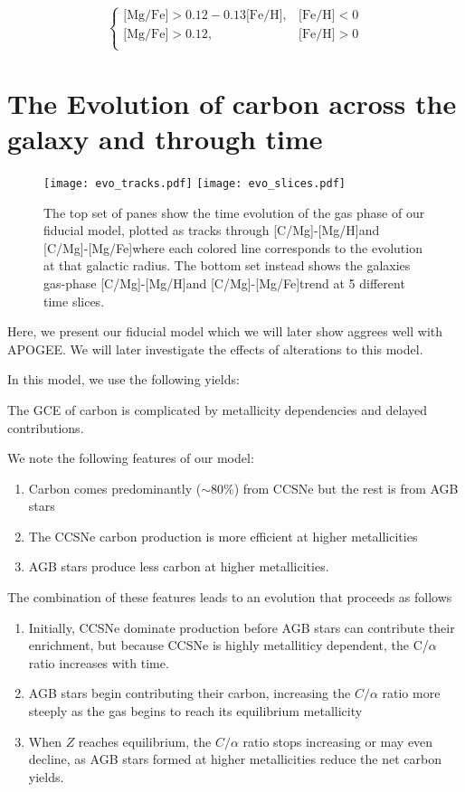 \documentclass[12pt,oneside]{report}
\newcommand{\caah}{[C/Mg]-[Mg/H]}
\newcommand{\caafe}{[C/Mg]-[Mg/Fe]}
\begin{document}
\begin{equation}
\begin{cases}
\text{[Mg/Fe]} >0.12-0.13\text{[Fe/H]}, & \text{[Fe/H]}<0\\
\text{[Mg/Fe]} >0.12, & \text{[Fe/H]}>0\\
\end{cases}
\end{equation}




\section{The Evolution of carbon across the galaxy and through time}

\begin{figure}
\label{fig:c_evo}
\texttt{[image: evo\_tracks.pdf]}
\texttt{[image: evo\_slices.pdf]}
\caption[Carbon chemical evolution tracks]{The top set of panes show the time evolution of the gas phase of our
    fiducial model, plotted as tracks through \caah and \caafe where each colored line corresponds to the evolution at that galactic radius. 
The bottom set instead shows the galaxies gas-phase \caah and \caafe trend at 5 different time slices. 
}
\end{figure}

Here, we present our fiducial model which we will later show aggrees well with APOGEE. We will later investigate the effects of alterations to this model. 

In this model, we use the following yields:

The GCE of carbon is complicated by metallicity dependencies and delayed contributions. 

We note the following features of our model:

\begin{enumerate}
    \item Carbon comes predominantly ($\sim80\%$) from CCSNe but the rest is from AGB stars
    \item The CCSNe carbon production is more efficient at higher metallicities
    \item AGB stars produce less carbon at higher metallicities.
\end{enumerate}


The combination of these features leads to an evolution that proceeds as follows
\begin{enumerate}
    \item Initially, CCSNe dominate production before AGB stars can contribute their enrichment, but because CCSNe is highly metalliticy dependent, the C/$\alpha$ ratio increases with time.
    \item AGB stars begin contributing their carbon, increasing the $C/\alpha$ ratio more steeply as the gas begins to reach its equilibrium metallicity
    \item When $Z$ reaches equilibrium, the $C/\alpha$ ratio stops increasing or may even decline, as AGB stars formed at higher metallicities reduce the net carbon yields.
\end{enumerate}
\end{document}
